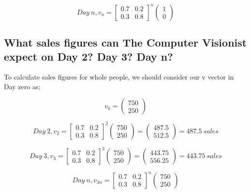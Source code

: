 \documentclass[11pt]{article} %
\begin{document}
$$Day\ n, v_{n} = 
   \begin{bmatrix}
	0.7 & 0.2 \\ 0.3 & 0.8
 \end{bmatrix} ^ {n} \begin{pmatrix} 1 \\ 0 \end{pmatrix}
$$


\subsection{What sales figures can The Computer Visionist expect on Day 2? Day 3? Day n?}

To calculate sales figures for whole people, we should consider our v vector in Day zero as;

$$v_{0} = 
  \begin{pmatrix} 750 \\ 250 \end{pmatrix}
$$

$$Day\ 2, v_{2} = 
   \begin{bmatrix}
	0.7 & 0.2 \\ 0.3 & 0.8
 \end{bmatrix} ^ {2} \begin{pmatrix} 750 \\ 250 \end{pmatrix}
 = \begin{pmatrix} 487.5 \\ 512.5 \end{pmatrix} = 487.5\ sales
$$

$$Day\ 3, v_{3} = 
   \begin{bmatrix}
	0.7 & 0.2 \\ 0.3 & 0.8
 \end{bmatrix} ^ {3} \begin{pmatrix} 750 \\ 250 \end{pmatrix}
 = \begin{pmatrix} 443.75 \\ 556.25 \end{pmatrix} = 443.75\ sales
$$

$$Day\ n, v_{3n} = 
   \begin{bmatrix}
	0.7 & 0.2 \\ 0.3 & 0.8
 \end{bmatrix} ^ {n} \begin{pmatrix} 750 \\ 250 \end{pmatrix}
$$
\end{document}
